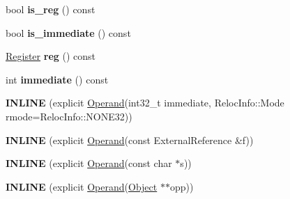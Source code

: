 \begin{DoxyCompactItemize}
\item 
bool {\bfseries is\+\_\+reg} () const \hypertarget{classv8_1_1internal_1_1_b_a_s_e___e_m_b_e_d_d_e_d_ae25a8832ae2af4b4cde08c6805c0e683}{}\label{classv8_1_1internal_1_1_b_a_s_e___e_m_b_e_d_d_e_d_ae25a8832ae2af4b4cde08c6805c0e683}

\item 
bool {\bfseries is\+\_\+immediate} () const \hypertarget{classv8_1_1internal_1_1_b_a_s_e___e_m_b_e_d_d_e_d_a7d1c398fa572dc740d7ef596eec11103}{}\label{classv8_1_1internal_1_1_b_a_s_e___e_m_b_e_d_d_e_d_a7d1c398fa572dc740d7ef596eec11103}

\item 
\hyperlink{structv8_1_1internal_1_1_register}{Register} {\bfseries reg} () const \hypertarget{classv8_1_1internal_1_1_b_a_s_e___e_m_b_e_d_d_e_d_af39795f113894c295306762723817d84}{}\label{classv8_1_1internal_1_1_b_a_s_e___e_m_b_e_d_d_e_d_af39795f113894c295306762723817d84}

\item 
int {\bfseries immediate} () const \hypertarget{classv8_1_1internal_1_1_b_a_s_e___e_m_b_e_d_d_e_d_a8a4db8884bdb382d483907dbdf9cd26c}{}\label{classv8_1_1internal_1_1_b_a_s_e___e_m_b_e_d_d_e_d_a8a4db8884bdb382d483907dbdf9cd26c}

\item 
{\bfseries I\+N\+L\+I\+NE} (explicit \hyperlink{classv8_1_1internal_1_1_operand}{Operand}(int32\+\_\+t immediate,                           Reloc\+Info\+::\+Mode rmode=Reloc\+Info\+::\+N\+O\+N\+E32))\hypertarget{classv8_1_1internal_1_1_b_a_s_e___e_m_b_e_d_d_e_d_a2715aaa79413195839e60721e4c0a587}{}\label{classv8_1_1internal_1_1_b_a_s_e___e_m_b_e_d_d_e_d_a2715aaa79413195839e60721e4c0a587}

\item 
{\bfseries I\+N\+L\+I\+NE} (explicit \hyperlink{classv8_1_1internal_1_1_operand}{Operand}(const External\+Reference \&f))\hypertarget{classv8_1_1internal_1_1_b_a_s_e___e_m_b_e_d_d_e_d_a5a7a275240d4134c48a50f3f58fbc6e9}{}\label{classv8_1_1internal_1_1_b_a_s_e___e_m_b_e_d_d_e_d_a5a7a275240d4134c48a50f3f58fbc6e9}

\item 
{\bfseries I\+N\+L\+I\+NE} (explicit \hyperlink{classv8_1_1internal_1_1_operand}{Operand}(const char $\ast$s))\hypertarget{classv8_1_1internal_1_1_b_a_s_e___e_m_b_e_d_d_e_d_a03174180d491fd255b2842c1559d9c7b}{}\label{classv8_1_1internal_1_1_b_a_s_e___e_m_b_e_d_d_e_d_a03174180d491fd255b2842c1559d9c7b}

\item 
{\bfseries I\+N\+L\+I\+NE} (explicit \hyperlink{classv8_1_1internal_1_1_operand}{Operand}(\hyperlink{classv8_1_1internal_1_1_object}{Object} $\ast$$\ast$opp))\hypertarget{classv8_1_1internal_1_1_b_a_s_e___e_m_b_e_d_d_e_d_a6e4080677ff131b6ccc805fa78ff5e05}{}\label{classv8_1_1internal_1_1_b_a_s_e___e_m_b_e_d_d_e_d_a6e4080677ff131b6ccc805fa78ff5e05}


\end{DoxyCompactItemize}
